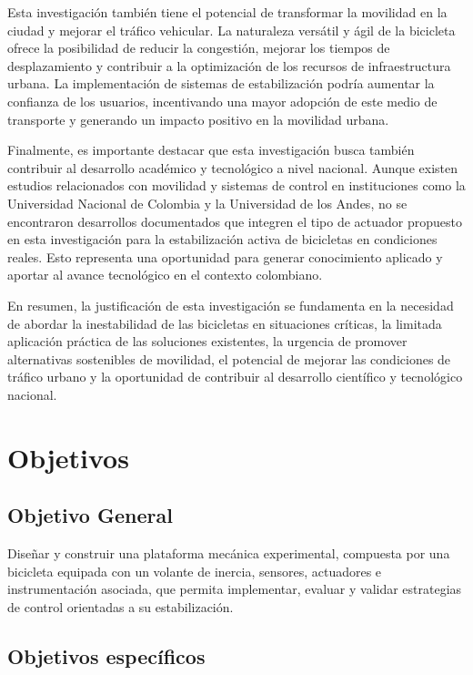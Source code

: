 \documentclass[12pt,letterpaper]{report}
\begin{document}
Esta investigación también tiene el potencial de transformar la movilidad en la ciudad y mejorar el tráfico vehicular. La naturaleza versátil y ágil de la bicicleta ofrece la posibilidad de reducir la congestión, mejorar los tiempos de desplazamiento y contribuir a la optimización de los recursos de infraestructura urbana. La implementación de sistemas de estabilización podría aumentar la confianza de los usuarios, incentivando una mayor adopción de este medio de transporte y generando un impacto positivo en la movilidad urbana.

Finalmente, es importante destacar que esta investigación busca también contribuir al desarrollo académico y tecnológico a nivel nacional. Aunque existen estudios relacionados con movilidad y sistemas de control en instituciones como la Universidad Nacional de Colombia y la Universidad de los Andes, no se encontraron desarrollos documentados que integren el tipo de actuador propuesto en esta investigación para la estabilización activa de bicicletas en condiciones reales. Esto representa una oportunidad para generar conocimiento aplicado y aportar al avance tecnológico en el contexto colombiano.

En resumen, la justificación de esta investigación se fundamenta en la necesidad de abordar la inestabilidad de las bicicletas en situaciones críticas, la limitada aplicación práctica de las soluciones existentes, la urgencia de promover alternativas sostenibles de movilidad, el potencial de mejorar las condiciones de tráfico urbano y la oportunidad de contribuir al desarrollo científico y tecnológico nacional.

\chapter{Objetivos}

\section{Objetivo General}

Diseñar y construir una plataforma mecánica experimental, compuesta por una bicicleta equipada con un volante de inercia, sensores, actuadores e instrumentación asociada, que permita implementar, evaluar y validar estrategias de control orientadas a su estabilización.

\section{Objetivos específicos}
\end{document}
